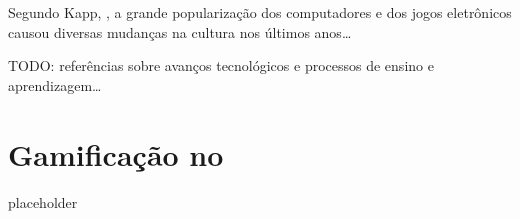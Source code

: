 Segundo Kapp, \cite{kapp_gamification}, a grande popularização dos computadores e dos jogos eletrônicos causou diversas mudanças na cultura nos últimos anos\dots

TODO: referências sobre avanços tecnológicos e processos de ensino e aprendizagem\dots

\section{Gamificação no \appName}

placeholder
